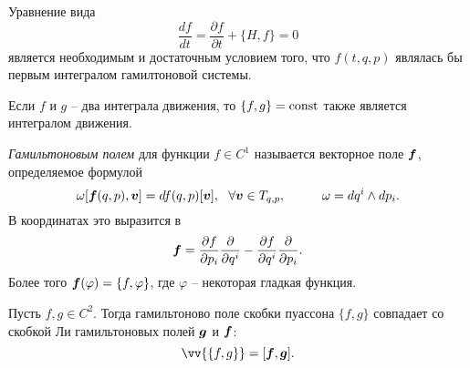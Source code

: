 \begin{to_lem} 
    Уравнение вида 
    \begin{equation*}
         \frac{d f}{d t} = \frac{\partial f}{\partial t} + \{H, f\} = 0
     \end{equation*} 
     является необходимым и достаточным условием того, что $f(t, q, p)$ являлась бы первым интегралом гамилтоновой системы.
\end{to_lem}

\begin{to_thr}
     Если $f$ и $g$ -- два интеграла движения, то $\{f, g\} = \text{const}$ также является интегралом движения.
\end{to_thr}

\begin{to_def} 
    \textit{Гамильтоновым полем} для функции $f \in C^1$ называется векторное поле $\mbox{\boldmath $f$}$, определяемое формулой
    \begin{equation*}
        \omega[ \mbox{\boldmath $f$}(q, p), \mbox{\boldmath $v$}] = df(q, p) [\mbox{\boldmath $v$}], \ \ \forall \mbox{\boldmath $v$} \in T_{q, p},
        \hspace{1cm} 
        \omega = dq^i \wedge dp_i.
    \end{equation*}
    В координатах это выразится в 
    \begin{equation*}
        \mbox{\boldmath $f$} = \frac{\partial f}{\partial p_i} \frac{\partial }{\partial q^i} - \frac{\partial f}{\partial q^i} \frac{\partial }{\partial p_i}.
    \end{equation*}
    Более того $\mbox{\boldmath $f$}(\varphi) = \{f, \varphi\}$, где $\varphi$ -- некоторая гладкая функция.
\end{to_def}

\begin{to_thr}
     Пусть $f, g \in C^2$. Тогда гамильтоново поле скобки пуассона $\{f, g\}$ совпадает со скобкой Ли гамильтоновых полей $\mbox{\boldmath $g$}$ и $\mbox{\boldmath $f$}$: 
     \begin{equation*}
         \vv{
         \{f, g\}
         } = [\vc{f}, \vc{g}].
     \end{equation*}
\end{to_thr}

